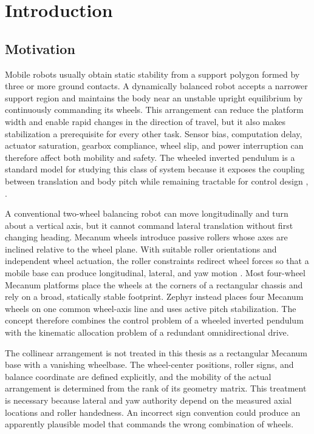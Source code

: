 \chapter{Introduction}\label{ch:introduction}

\section{Motivation}\label{motivation}

Mobile robots usually obtain static stability from a support polygon
formed by three or more ground contacts. A dynamically balanced robot
accepts a narrower support region and maintains the body near an
unstable upright equilibrium by continuously commanding its wheels. This
arrangement can reduce the platform width and enable rapid changes in
the direction of travel, but it also makes stabilization a prerequisite
for every other task. Sensor bias, computation delay, actuator
saturation, gearbox compliance, wheel slip, and power interruption can
therefore affect both mobility and safety. The wheeled inverted pendulum
is a standard model for studying this class of system because it exposes
the coupling between translation and body pitch while remaining
tractable for control design \cite{grasser2002joe}, \cite{pathak2005wip}.

A conventional two-wheel balancing robot can move longitudinally and
turn about a vertical axis, but it cannot command lateral translation
without first changing heading. Mecanum wheels introduce passive rollers
whose axes are inclined relative to the wheel plane. With suitable
roller orientations and independent wheel actuation, the roller
constraints redirect wheel forces so that a mobile base can produce
longitudinal, lateral, and yaw motion \cite{pin1994omnidirectional,ilon1975mecanum,gfrerrer2008geometry,indiveri2009swedish,ferriere1996omnimobile,muir1987kinematic}. Most four-wheel
Mecanum platforms place the wheels at the corners of a rectangular
chassis and rely on a broad, statically stable footprint. Zephyr instead
places four Mecanum wheels on one common wheel-axis line and uses active
pitch stabilization. The concept therefore combines the control problem
of a wheeled inverted pendulum with the kinematic allocation problem of
a redundant omnidirectional drive.

The collinear arrangement is not treated in this thesis as a rectangular
Mecanum base with a vanishing wheelbase. The wheel-center positions,
roller signs, and balance coordinate are defined explicitly, and the
mobility of the actual arrangement is determined from the rank of its
geometry matrix. This treatment is necessary because lateral and yaw
authority depend on the measured axial locations and roller handedness.
An incorrect sign convention could produce an apparently plausible model
that commands the wrong combination of wheels.

